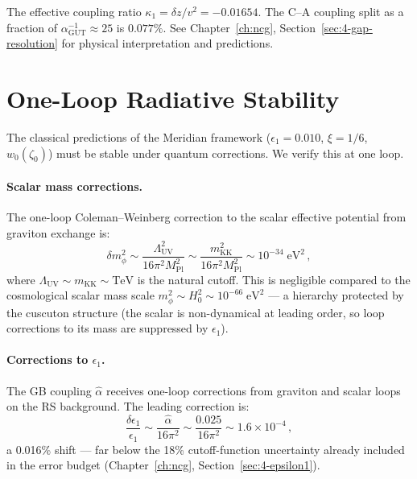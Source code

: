 The effective coupling ratio $\kappa_1 = \delta z / v^2 = -0.01654$.  The C--A coupling split as a fraction of $\alpha_{\mathrm{GUT}}^{-1} \approx 25$ is $0.077\%$.  See Chapter~\ref{ch:ncg}, Section~\ref{sec:4-gap-resolution} for physical interpretation and predictions.


\section{One-Loop Radiative Stability}
\label{app:radiative-stability}

The classical predictions of the Meridian framework ($\epsilon_1 = 0.010$, $\xi = 1/6$, $w_0(\zeta_0)$) must be stable under quantum corrections. We verify this at one loop.

\paragraph{Scalar mass corrections.}
The one-loop Coleman--Weinberg correction to the scalar effective potential from graviton exchange is:
\begin{equation}
  \delta m_\phi^2 \sim \frac{\Lambda_{\mathrm{UV}}^2}{16\pi^2 M_{\mathrm{Pl}}^2} \sim \frac{m_{\mathrm{KK}}^2}{16\pi^2 M_{\mathrm{Pl}}^2} \sim 10^{-34}\;\mathrm{eV}^2\,,
\end{equation}
where $\Lambda_{\mathrm{UV}} \sim m_{\mathrm{KK}} \sim \mathrm{TeV}$ is the natural cutoff. This is negligible compared to the cosmological scalar mass scale $m_\phi^2 \sim H_0^2 \sim 10^{-66}\;\mathrm{eV}^2$ --- a hierarchy protected by the cuscuton structure (the scalar is non-dynamical at leading order, so loop corrections to its mass are suppressed by $\epsilon_1$).

\paragraph{Corrections to $\epsilon_1$.}
The GB coupling $\hat{\alpha}$ receives one-loop corrections from graviton and scalar loops on the RS background. The leading correction is:
\begin{equation}
  \frac{\delta\epsilon_1}{\epsilon_1} \sim \frac{\hat{\alpha}}{16\pi^2} \sim \frac{0.025}{16\pi^2} \sim 1.6 \times 10^{-4}\,,
\end{equation}
a 0.016\% shift --- far below the 18\% cutoff-function uncertainty already included in the error budget (Chapter~\ref{ch:ncg}, Section~\ref{sec:4-epsilon1}).

